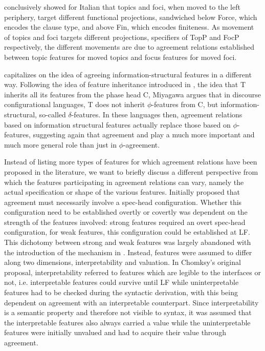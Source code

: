 \documentclass[output=paper
,modfonts
,nonflat]{langsci/langscibook}
\begin{document}
\citet{Rizzi1997} conclusively showed for Italian that topics and foci, when moved to the left periphery, target different functional projections, sandwiched below Force, which encodes the clause type, and above Fin, which encodes finiteness. As movement of topics and foci targets different projections, specifiers of TopP and FocP respectively, the different movements are due to agreement relations established between topic features for moved topics and focus features for moved foci. 

\citet{Miyagawa2010,Miyagawa2017} capitalizes on the idea of agreeing information-struc\-tur\-al features in a different way. Following the idea of feature inheritance introduced in \citet{Chomsky2008}, the idea that T inherits all its features from the phase head C, Miyagawa argues that in discourse configurational languages, T does not inherit $\phi$-fea\-tures from C, but information-structural, so-called $\delta$-features. In these languages then, agreement relations based on information structural features actually replace those based on $\phi$-fea\-tures, suggesting again that agreement and {\agr} play a much more important and much more general role than just in $\phi$-agreement.

Instead of listing more types of features for which agreement relations have been proposed in the literature, we want to briefly discuss a different perspective from which the features participating in agreement relations can vary, namely the actual specification or shape of the various features. 
Initially \citet{Chomsky1995} proposed that agreement must necessarily involve a spec-head configuration. Whether this configuration need to be established overtly or covertly was dependent on the strength of the features involved: strong features required an overt spec-head configuration, for weak features, this configuration could be established at LF. This dichotomy between strong and weak features was largely abandoned with the introduction of the \agr{} mechanism in \citet{Chomsky2000,Chomsky2001}. Instead, features were assumed to differ along two dimensions, interpretability and valuation. In Chomksy's original proposal, interpretability referred to features which are legible to the interfaces or not, i.e. interpretable features could survive until LF while uninterpretable features had to be checked during the syntactic derivation, with this being dependent on agreement with an interpretable counterpart. Since interpretability is a semantic property and therefore not visible to syntax, it was assumed that the interpretable features also always carried a value while the uninterpretable features were initially unvalued and had to acquire their value through agreement.
\end{document}
